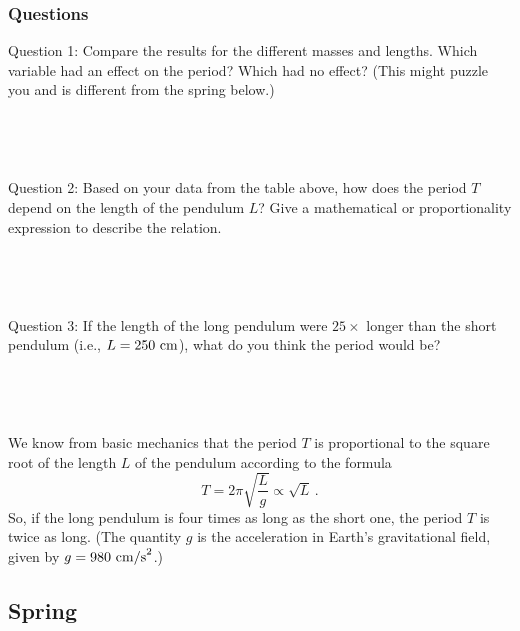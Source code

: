 \documentclass[11pt]{NSF}
\def\be{\begin{equation}}
\def\ee{\end{equation}}
\begin{document}
\subsubsection*{Questions}
Question 1: \hspace{.5cm} Compare the results for the different masses and lengths. 
Which variable had an effect on the period? Which had no effect? 
(This might puzzle you and is different from the spring below.)
\\
\\
\\
\\
\\

Question 2: \hspace{.5cm}  Based on your data from the table above, how does the period $T$ depend on the length of the pendulum $L$? Give a mathematical or proportionality expression to describe the relation. 
\\
\\
\\
\\
\\

Question 3: \hspace{.5cm} If the length of the long pendulum were $25\times$ longer 
than the short pendulum (i.e., $L=250~{\rm cm}$), what do you think
the period would be?
\\
\\
\\
\\
\\

We know from basic mechanics that the period $T$ is proportional 
to the square root of the length $L$ of the pendulum according to the formula
\be
T=2\pi\sqrt{\frac{L}{g}}\propto \sqrt{L}\,.
\ee
So, if the long pendulum is four times as long as the short one, 
the period $T$ is twice as long. 
(The quantity $g$ is the acceleration in Earth’s gravitational field, 
given by $g = 980~{\rm cm/s}^2$.)

\subsection{Spring}
\end{document}
